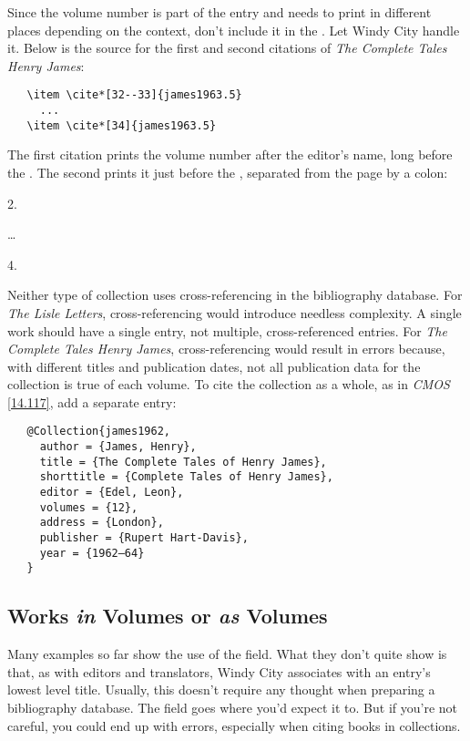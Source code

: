 \documentclass[11pt,letterpaper,oneside]{article}
\begin{document}
Since the volume number is part of the entry and needs to print in
different places depending on the context, don't include it in the
. Let Windy City handle it. Below is the source for
the first and second citations of \textit{The Complete Tales Henry
James}:

\begin{verbatim}
   \item \cite*[32--33]{james1963.5}
     ...
   \item \cite*[34]{james1963.5}
\end{verbatim}

\noindent The first citation prints the volume number after the
editor's name, long before the . The second prints
it just before the , separated from the page by a
colon:

\begin{citeonly}
\item[2.] \cite*[32--33]{james1963.5}
\item[\ldots]
\item[4.] \cite*[34]{james1963.5}
\end{citeonly}

Neither type of collection uses cross-referencing in the bibliography
database. For \textit{The Lisle Letters}, cross-referencing would
introduce needless complexity. A single work should have a single
entry, not multiple, cross-referenced entries. For \textit{The
Complete Tales Henry James}, cross-referencing would result in errors
because, with different titles and publication dates, not all
publication data for the collection is true of each volume. To cite
the collection as a whole, as in \textit{CMOS} \ref{14.117}, add a
separate entry:

\begin{verbatim}
   @Collection{james1962,
     author = {James, Henry},
     title = {The Complete Tales of Henry James},
     shorttitle = {Complete Tales of Henry James},
     editor = {Edel, Leon},
     volumes = {12},
     address = {London},
     publisher = {Rupert Hart-Davis},
     year = {1962–64}
   }
\end{verbatim}

\subsection{Works \textit{in} Volumes or \textit{as} Volumes}

Many examples so far show the use of the  field. What
they don't quite show is that, as with editors and translators, Windy
City associates  with an entry's lowest level title.
Usually, this doesn't require any thought when preparing a
bibliography database. The  field goes where you'd
expect it to. But if you're not careful, you could end up with errors,
especially when citing books in collections.
\end{document}
